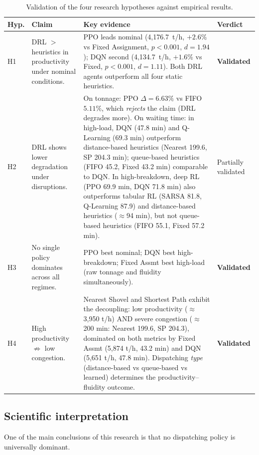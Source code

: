 \documentclass[11pt,a4paper]{article}
\begin{document}
\begin{table}[H]
\caption{Validation of the four research hypotheses against empirical results.}
\label{tab:hypotheses}
\footnotesize\setlength{\tabcolsep}{4pt}
\begin{tabularx}{\textwidth}{@{}lXXl@{}}
\toprule
\textbf{Hyp.} & \textbf{Claim} & \textbf{Key evidence} & \textbf{Verdict} \\
\midrule
H1 & DRL $>$ heuristics in productivity under nominal conditions. & PPO leads nominal (4,176.7~t/h, $+2.6\%$ vs Fixed Assignment, $p<0.001$, $d=1.94$); DQN second (4,134.7~t/h, $+1.6\%$ vs Fixed, $p<0.001$, $d=1.11$). Both DRL agents outperform all four static heuristics. & \textbf{Validated} \\[4pt]
H2 & DRL shows lower degradation under disruptions. & On tonnage: PPO $\Delta{=}6.63\%$ vs FIFO $5.11\%$, which \textit{rejects} the claim (DRL degrades more). On waiting time: in high-load, DQN (47.8 min) and Q-Learning (69.3 min) outperform distance-based heuristics (Nearest 199.6, SP 204.3 min); queue-based heuristics (FIFO 45.2, Fixed 43.2 min) comparable to DQN. In high-breakdown, deep RL (PPO 69.9 min, DQN 71.8 min) also outperforms tabular RL (SARSA 81.8, Q-Learning 87.9) and distance-based heuristics ($\approx$94 min), but not queue-based heuristics (FIFO 55.1, Fixed 57.2 min). & Partially validated \\[4pt]
H3 & No single policy dominates across all regimes. & PPO best nominal; DQN best high-breakdown; Fixed Assmt best high-load (raw tonnage and fluidity simultaneously). & \textbf{Validated} \\[4pt]
H4 & High productivity $\not\Rightarrow$ low congestion. & Nearest Shovel and Shortest Path exhibit the decoupling: low productivity ($\approx$3,950 t/h) AND severe congestion ($\approx$200 min: Nearest 199.6, SP 204.3), dominated on both metrics by Fixed Assmt (5,874 t/h, 43.2 min) and DQN (5,651 t/h, 47.8 min). Dispatching \emph{type} (distance-based vs queue-based vs learned) determines the productivity--fluidity outcome. & \textbf{Validated} \\
\bottomrule
\end{tabularx}
\end{table}

\subsection{Scientific interpretation}

One of the main conclusions of this research is that no dispatching policy is universally dominant.
\end{document}
